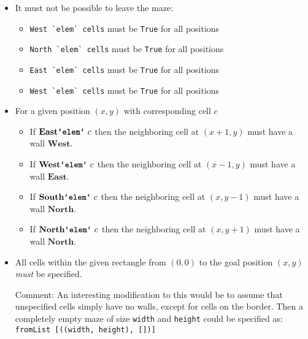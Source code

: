 \documentclass[a4paper]{article}
\newcommand{\west}{\ensuremath{\textbf{West}}\xspace}
\newcommand{\east}{\ensuremath{\textbf{East}}\xspace}
\newcommand{\south}{\ensuremath{\textbf{South}}\xspace}
\newcommand{\north}{\ensuremath{\textbf{North}}\xspace}
\newcommand{\el}{\ensuremath{\textbf{`elem`}}\xspace}
\newcommand{\src}[1]{\texttt{#1}\xspace}
\newcommand{\func}[1]{\textbf{\ttfamily #1}\xspace}
\begin{document}
\begin{itemize}
  \item It must not be possible to leave the maze:
    \begin{itemize}\setlength{\itemsep}{-2pt}
      \item \verb|West `elem` cells| must be \texttt{True} for all positions 
      \item \verb|North `elem` cells| must be \texttt{True} for all positions 
      \item \verb|East `elem` cells| must be \texttt{True} for all positions 
      \item \verb|West `elem` cells| must be \texttt{True} for all positions 
    \end{itemize}
  \item For a given position $(x,y)$ with corresponding cell $c$
    \begin{itemize}\setlength{\itemsep}{-2pt}
      \item If $\east \text{\func{`elem`} } c$ then the neighboring cell at $(x+1,y)$ must have a wall \west.
      \item If $\west \text{\func{`elem`} } c$ then the neighboring cell at $(x-1,y)$ must have a wall \east.
      \item If $\south \text{\func{`elem`} } c$ then the neighboring cell at $(x,y-1)$ must have a wall \north.
      \item If $\north \text{\func{`elem`} } c$ then the neighboring cell at $(x,y+1)$ must have a wall \north.
    \end{itemize}
  \item All cells within the given rectangle from $(0,0)$ to the goal
    position $(x,y)$ \emph{must} be specified.

    Comment: An interesting modification to this would be to assume that unspecified cells
    simply have no walls, except for cells on the border. Then a
    completely empty maze of size \src{width} and \src{height} could
    be specified as: \src{\scriptsize fromList [((width, height), [])]}
\end{itemize}
\end{document}
